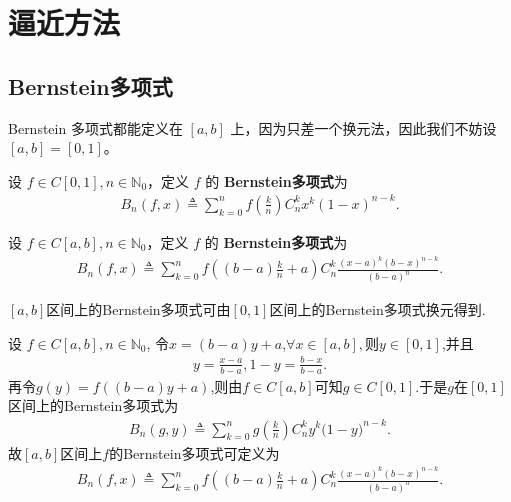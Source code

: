 \documentclass[../../main.tex]{subfiles}%
\begin{document}
\section{逼近方法}

\subsection{Bernstein多项式}

Bernstein 多项式都能定义在 $[a,b]$ 上，因为只差一个换元法，因此我们不妨设 $[a,b]=[0,1]$。

\begin{definition}\label{definition:一维Bernstein多项式}
设 $f \in C[0,1], n \in \mathbb{N}_0$，定义 $f$ 的 \textbf{Bernstein多项式}为
\begin{align*}
B_n(f,x) \triangleq \sum_{k = 0}^{n} f\left(\frac{k}{n}\right) C_{n}^{k} x^{k} (1 - x)^{n - k}.
\end{align*} 

设 $f \in C[a,b], n \in \mathbb{N}_0$，定义 $f$ 的 \textbf{Bernstein多项式}为
\begin{align*}
B_n(f,x)\triangleq \sum_{k=0}^n{f\left( \left( b-a \right) \frac{k}{n}+a \right) C_{n}^{k}\frac{\left( x-a \right) ^k\left( b-x \right) ^{n-k}}{\left( b-a \right) ^n}}.
\end{align*} 
\end{definition}
\begin{remark}
$[a,b]$区间上的Bernstein多项式可由$[0,1]$区间上的Bernstein多项式换元得到.

设 $f \in C[a,b], n \in \mathbb{N}_0$,
令$x=(b-a)y+a$,$\forall x\in [a,b],$则$y\in [0,1]$,并且
\begin{align*}
y=\frac{x-a}{b-a},1-y=\frac{b-x}{b-a}.
\end{align*}
再令$g(y)=f((b-a)y+a)$,则由$f\in C[a,b]$可知$g\in C[0,1]$.于是$g$在$[0,1]$区间上的Bernstein多项式为
\begin{align*}
B_n(g,y)\triangleq \sum_{k=0}^n{g\left( \frac{k}{n} \right) C_{n}^{k}y^k(1}-y)^{n-k}.
\end{align*}
故$[a,b]$区间上$f$的Bernstein多项式可定义为
\begin{align*}
B_n(f,x) \triangleq \sum_{k=0}^n{f\left( \left( b-a \right) \frac{k}{n}+a \right) C_{n}^{k}\frac{\left( x-a \right) ^k\left( b-x \right) ^{n-k}}{\left( b-a \right) ^n}}.
\end{align*}
\end{remark}
\end{document}
